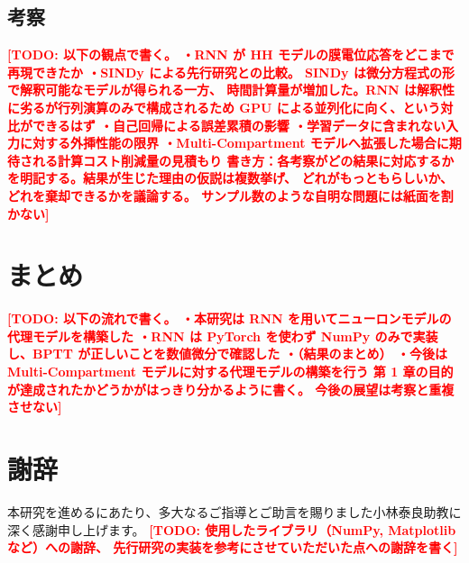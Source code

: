 \documentclass[a4paper,11pt,openany]{ltjsreport}
\newcommand{\TODO}[1]{\textcolor{red}{\textbf{[TODO: #1]}}}
\begin{document}
\section{考察}

\TODO{以下の観点で書く。
      ・RNN が HH モデルの膜電位応答をどこまで再現できたか
      ・SINDy による先行研究\cite{munechika2025}との比較。
        SINDy は微分方程式の形で解釈可能なモデルが得られる一方、
        時間計算量が増加した。RNN は解釈性に劣るが行列演算のみで構成されるため
        GPU による並列化に向く、という対比ができるはず
      ・自己回帰による誤差累積の影響
      ・学習データに含まれない入力に対する外挿性能の限界
      ・Multi-Compartment モデルへ拡張した場合に期待される計算コスト削減量の見積もり
      書き方：各考察がどの結果に対応するかを明記する。結果が生じた理由の仮説は複数挙げ、
      どれがもっともらしいか、どれを棄却できるかを議論する。
      サンプル数のような自明な問題には紙面を割かない}

\chapter{まとめ}

\TODO{以下の流れで書く。
      ・本研究は RNN を用いてニューロンモデルの代理モデルを構築した
      ・RNN は PyTorch を使わず NumPy のみで実装し、BPTT が正しいことを数値微分で確認した
      ・（結果のまとめ）
      ・今後は Multi-Compartment モデルに対する代理モデルの構築を行う
      第 1 章の目的が達成されたかどうかがはっきり分かるように書く。
      今後の展望は考察と重複させない}

\chapter*{謝辞}

本研究を進めるにあたり、多大なるご指導とご助言を賜りました小林泰良助教に
深く感謝申し上げます。
\TODO{使用したライブラリ（NumPy, Matplotlib など）への謝辞、
      先行研究の実装を参考にさせていただいた点への謝辞を書く}
\end{document}
